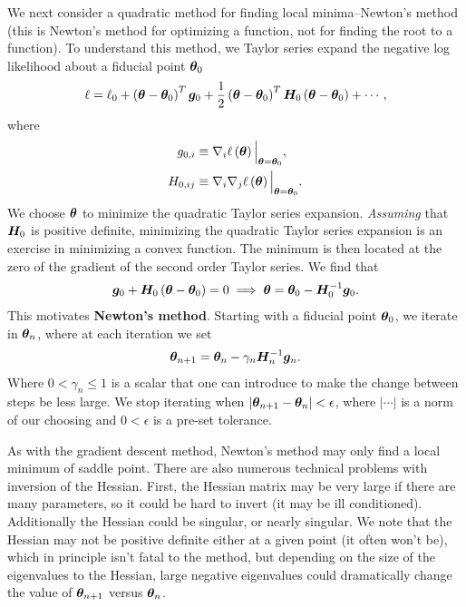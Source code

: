 We next consider a quadratic method for finding local minima--Newton's method
(this is Newton's method for optimizing a function, not for finding the root to a function).
To understand this method, we Taylor series expand the negative log likelihood
about a fiducial point ${\bm \theta}_0$
\begin{align}
    \label{eq:quadratic-taylor-vector}
    \ell 
    =
    \ell_0
    +
    \left({\bm \theta}-{\bm \theta}_0\right)^T{\bm g}_0
    +
    \frac{1}{2}\left({\bm \theta}-{\bm \theta}_0\right)^T {\bm H}_0 \left({\bm \theta}-{\bm \theta}_0\right) 
    +
    \cdots
    ,
\end{align}
where
\begin{align}
    g_{0,i}
    &\equiv
    \nabla_i\ell\left({\bm \theta}\right)\Big|_{{\bm \theta}={\bm \theta}_0}
    ,\\
    H_{0,ij}
    &\equiv
    \nabla_i\nabla_j\ell\left({\bm \theta}\right)
    \Big|_{{\bm \theta}={\bm \theta}_0}
    .
\end{align}
We choose ${\bm \theta}$ to minimize the quadratic Taylor series expansion.
\emph{Assuming} that ${\bm H}_0$ is positive definite, minimizing the quadratic
Taylor series expansion is an exercise in minimizing a convex function.
The minimum is then located at the zero of the gradient of the second order Taylor series.
We find that
\begin{align}
    {\bm g}_0 + {\bm H}_0 \left({\bm \theta} - {\bm \theta}_0\right) = 0
    \implies
    {\bm \theta} = {\bm \theta}_0 - {\bm H}_0^{-1} {\bm g}_0
    .
\end{align}
This motivates \textbf{Newton's method}.
Starting with a fiducial point ${\bm \theta}_0$, we iterate in ${\bm \theta}_n$, where
at each iteration we set 
\begin{align}
    {\bm \theta}_{n+1} = {\bm \theta}_n - \gamma_n {\bm H}_n^{-1} {\bm g}_n
    .
\end{align}
Where $0<\gamma_n\leq1$
is a scalar that one can introduce to make the change between steps be less large.
We stop iterating when $\left|{\bm \theta}_{n+1}-{\bm \theta}_n\right|<\epsilon$, where
$\left|\cdots\right|$ is a norm of our choosing and $0<\epsilon$ is a pre-set tolerance.

As with the gradient descent method, Newton's method may only find a local
minimum of saddle point. 
There are also numerous technical problems with inversion of the Hessian.
First, the Hessian matrix may be very large if there are many parameters,
so it could be hard to invert (it may be ill conditioned). 
Additionally the Hessian could be singular,
or nearly singular.
We note that the Hessian may not be positive definite either at a given point
(it often won't be), which in principle isn't
fatal to the method, but depending on the size of the eigenvalues to the
Hessian, large negative eigenvalues could dramatically change the
value of ${\bm \theta}_{n+1}$ versus ${\bm \theta}_n$.

